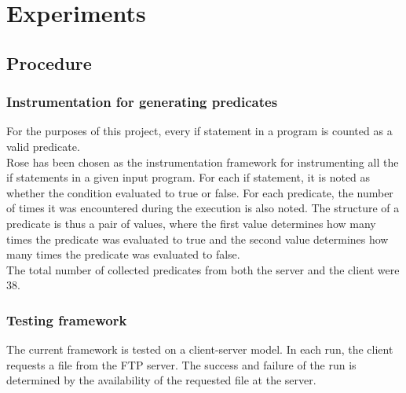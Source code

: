 \documentclass[a4paper,10pt, margin=0.75in]{article}
\begin{document}
\section{Experiments}
\subsection{Procedure}

\subsubsection{Instrumentation for generating predicates}
For the purposes of this project, every if statement in a program is counted as a valid predicate. \\
Rose has been chosen as the instrumentation framework for instrumenting all the if statements in a given input program. For each if statement, it is noted as whether the condition evaluated to true or false. For each predicate, the number of times it was encountered during the execution is also noted. The structure of a predicate is thus a pair of values, where the first value determines how many times the predicate was evaluated to true and the second value determines how many times the predicate was evaluated to false. \\
The total number of collected predicates from both the server and the client were 38.

\subsubsection{Testing framework}
The current framework is tested on a client-server model. In each run, the client requests a file from the FTP server. The success and failure of the run is determined by the availability of the requested file at the server.
\end{document}
